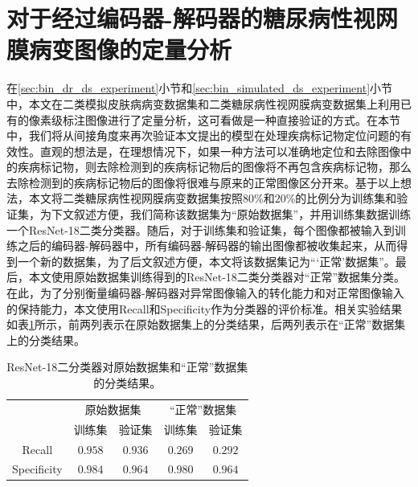 \section{对于经过编码器-解码器的糖尿病性视网膜病变图像的定量分析}\label{sec:indirect_quantitative_evaluation}
在\ref{sec:bin_dr_ds_experiment}小节和\ref{sec:bin_simulated_ds_experiment}小节中，本文在二类模拟皮肤病病变数据集和二类糖尿病性视网膜病变数据集上利用已有的像素级标注图像进行了定量分析，这可看做是一种直接验证的方式。在本节中，我们将从间接角度来再次验证本文提出的模型在处理疾病标记物定位问题的有效性。直观的想法是，在理想情况下，如果一种方法可以准确地定位和去除图像中的疾病标记物，则去除检测到的疾病标记物后的图像将不再包含疾病标记物，那么去除检测到的疾病标记物后的图像将很难与原来的正常图像区分开来。基于以上想法，本文将二类糖尿病性视网膜病变数据集按照$80$\%和$20$\%的比例分为训练集和验证集，为下文叙述方便，我们简称该数据集为“原始数据集”，并用训练集数据训练一个ResNet-18二类分类器。随后，对于训练集和验证集，每个图像都被输入到训练之后的编码器-解码器中，所有编码器-解码器的输出图像都被收集起来，从而得到一个新的数据集，为了后文叙述方便，本文将该数据集记为“‘正常’数据集”。最后，本文使用原始数据集训练得到的ResNet-18二类分类器对“正常”数据集分类。在此，为了分别衡量编码器-解码器对异常图像输入的转化能力和对正常图像输入的保持能力，本文使用Recall和Specificity作为分类器的评价标准。相关实验结果如表\ref{tab:quantitative_retinal}所示，前两列表示在原始数据集上的分类结果，后两列表示在“正常”数据集上的分类结果。
\begin{table}[h!]
	\begin{center}
		\caption[ResNet-18二分类器对原始数据集和“正常”数据集分类结果]{ResNet-18二分类器对原始数据集和“正常”数据集的分类结果。} 
		\label{tab:quantitative_retinal}
		\begin{tabular}{c|cc|cc}
			\toprule[2pt]
			& \multicolumn{2}{c|}{原始数据集} & \multicolumn{2}{c}{“正常”数据集} \\
			&  训练集 & 验证集 & 训练集 & 验证集\\
			\midrule[2pt]
			Recall & $0.958$ & $0.936$ & $0.269$ & $0.292$\\ \hline
			Specificity & $0.984$ & $0.964$ & $0.980$ & $0.964$\\
			\bottomrule[2pt]
		\end{tabular} 
	\end{center}
\end{table}

